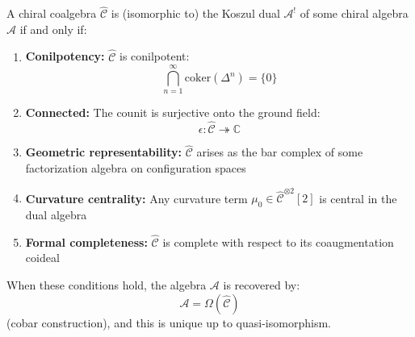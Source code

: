 \begin{theorem}\label{thm:essential-image-koszul}
A chiral coalgebra $\widehat{\mathcal{C}}$ is (isomorphic to) the Koszul dual 
$\mathcal{A}^!$ of some chiral algebra $\mathcal{A}$ if and only if:

\begin{enumerate}
\item \textbf{Conilpotency:} $\widehat{\mathcal{C}}$ is conilpotent:
      $$\bigcap_{n=1}^\infty \text{coker}(\Delta^n) = \{0\}$$
      
\item \textbf{Connected:} The counit is surjective onto the ground field:
      $$\epsilon: \widehat{\mathcal{C}} \twoheadrightarrow \mathbb{C}$$
      
\item \textbf{Geometric representability:} $\widehat{\mathcal{C}}$ arises as the 
      bar complex of some factorization algebra on configuration spaces
      
\item \textbf{Curvature centrality:} Any curvature term $\mu_0 \in \widehat{\mathcal{C}}^{\otimes 2}[2]$ 
      is central in the dual algebra
      
\item \textbf{Formal completeness:} $\widehat{\mathcal{C}}$ is complete with respect 
      to its coaugmentation coideal
\end{enumerate}

When these conditions hold, the algebra $\mathcal{A}$ is recovered by:
$$\mathcal{A} = \Omega(\widehat{\mathcal{C}})$$
(cobar construction), and this is unique up to quasi-isomorphism.
\end{theorem}

